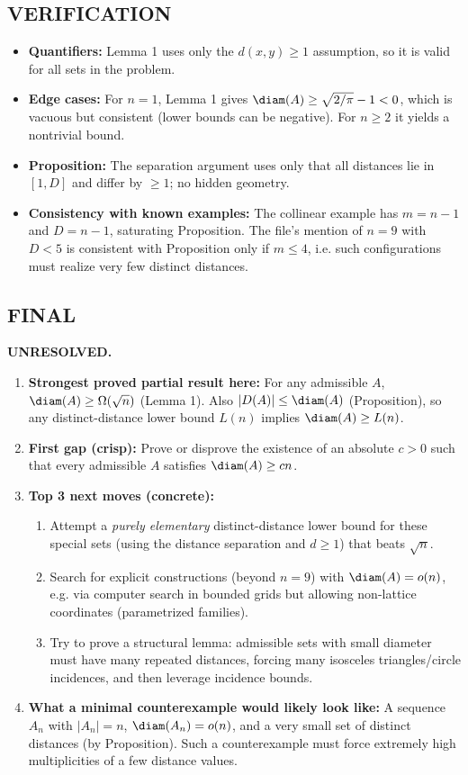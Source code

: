 \subsection*{VERIFICATION}
\begin{itemize}[leftmargin=2em]
\item \textbf{Quantifiers:} Lemma 1 uses only the $d(x,y)\ge 1$ assumption, so it is valid for all sets in the problem.
\item \textbf{Edge cases:} For $n=1$, Lemma 1 gives $\diam(A)\ge \sqrt{2/\pi}-1<0$, which is vacuous but consistent (lower bounds can be negative). For $n\ge 2$ it yields a nontrivial bound.
\item \textbf{Proposition:} The separation argument uses only that all distances lie in $[1,D]$ and differ by $\ge 1$; no hidden geometry.
\item \textbf{Consistency with known examples:} The collinear example has $m=n-1$ and $D=n-1$, saturating Proposition. The file's mention of $n=9$ with $D<5$ is consistent with Proposition only if $m\le 4$, i.e. such configurations must realize very few distinct distances.
\end{itemize}

\subsection*{FINAL}
\textbf{UNRESOLVED.}
\begin{enumerate}[label=(\roman*),leftmargin=2.5em]
\item \textbf{Strongest proved partial result here:}
For any admissible $A$, $\diam(A)\ge \Omega(\sqrt{n})$ (Lemma 1). Also $|D(A)|\le \diam(A)$ (Proposition), so any distinct-distance lower bound $L(n)$ implies $\diam(A)\ge L(n)$.
\item \textbf{First gap (crisp):}
Prove or disprove the existence of an absolute $c>0$ such that every admissible $A$ satisfies $\diam(A)\ge c n$.
\item \textbf{Top 3 next moves (concrete):}
\begin{enumerate}[label=(\alph*),leftmargin=2.5em]
\item Attempt a \emph{purely elementary} distinct-distance lower bound for these special sets (using the distance separation and $d\ge 1$) that beats $\sqrt{n}$.
\item Search for explicit constructions (beyond $n=9$) with $\diam(A)=o(n)$, e.g. via computer search in bounded grids but allowing non-lattice coordinates (parametrized families).
\item Try to prove a structural lemma: admissible sets with small diameter must have many repeated distances, forcing many isosceles triangles/circle incidences, and then leverage incidence bounds.
\end{enumerate}
\item \textbf{What a minimal counterexample would likely look like:}
A sequence $A_n$ with $|A_n|=n$, $\diam(A_n)=o(n)$, and a very small set of distinct distances (by Proposition). Such a counterexample must force extremely high multiplicities of a few distance values.
\end{enumerate}


